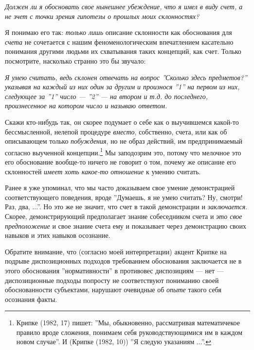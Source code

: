 \documentclass[11pt]{book}
\begin{document}
\smallskip

\textit{Должен ли я обосновать свое нынешнее убеждение, что я имел в виду счет, а не зчет с точки зрения гипотезы о прошлых моих склонностях?}

\smallskip

Я понимаю его так: \textit{только лишь} описание склонности как обоснования для \textit{счета} не сочетается с нашим феноменологическим впечатлением касательно понимания другими людьми их схватывания таких концепций, как счет. Только посмотрите, насколько странно это бы звучало:

\smallskip

\textit{Я умею считать, ведь склонен отвечать на вопрос ''Сколько здесь предметов?'' указывая на каждый из них один за другим и произнося ''1'' на первом из них, следующее за ''1'' число --- ''2'' --- на втором и т.д. до последнего, произнесенное на котором число и называю ответом.}

\smallskip

Скажи кто-нибудь так, он скорее подумает о себе как о выучившемся какой-то бессмысленной, нелепой процедуре \textit{вместо}, собственно, счета, или как об описывающем только \textit{побуждения}, но не образ действий, им предпринимаемый согласно выученной концепции.\footnote{Крипке (1982, 17) пишет: ''Мы, обыкновенно, рассматривая математичекое правило вроде сложения, понимаем себя руководствующимися им в каждом новом случае''. И (Крипке (1982, 10)) ''Я следую указаниям ...''.} Мы заподозрим это, потому что мелочное это его обоснование вообще-то ничего не говорит о том, почему же описание его склонностей \textit{имеет хоть какое-то отношение} к умению считать.

Ранее я уже упоминал, что мы часто доказываем свое умение демонстрацией соответствующего поведения, вроде ''Думаешь, я не умею считать? Ну, смотри! Раз, два, ...''. Но это же не значит, что счет в такой демонстрации и \textit{заключается}. Скорее, демонстрирующий предполагает знание собеседником счета и \textit{это свое предположение} и свое знание счета ему и показывает через демонстрацию своих навыков и этих навыков осознание.

Обратите внимание, что (согласно моей интерпретации) акцент Крипке на подрыве диспозиционных подходов требованием обоснования заключается не в этого обоснования ''нормативности'' в противовес диспозициям --- нет --- диспозиционные подходы попросту не соответствуют пониманию своей обоснованности субъектами, нарушают очевидные об \textit{опыте} такого себя осознания факты.
\end{document}

